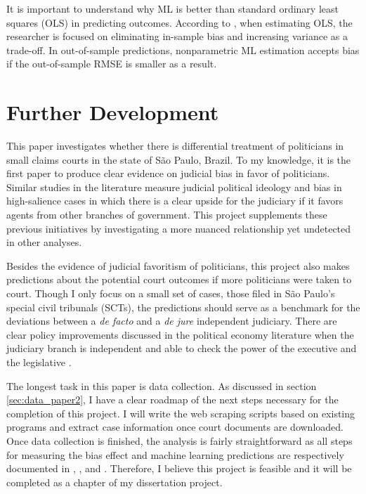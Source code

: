 \documentclass[11pt]{article}
\begin{document}
It is important to understand why ML is better than standard ordinary least squares (OLS) in predicting outcomes. According to \citet{KleinbergPredictionPolicyProblems2015}, when estimating OLS, the researcher is focused on eliminating in-sample bias and increasing variance as a trade-off. In out-of-sample predictions, nonparametric ML estimation accepts bias if the out-of-sample RMSE is smaller as a result.

\section{Further Development} \label{sec:conclusion_paper2}

This paper investigates whether there is differential treatment of politicians in small claims courts in the state of São Paulo, Brazil. To my knowledge, it is the first paper to produce clear evidence on judicial bias in favor of politicians. Similar studies in the literature measure judicial political ideology and bias in high-salience cases in which there is a clear upside for the judiciary if it favors agents from other branches of government. This project supplements these previous initiatives by investigating a more nuanced relationship yet undetected in other analyses.

Besides the evidence of judicial favoritism of politicians, this project also makes predictions about the potential court outcomes if more politicians were taken to court. Though I only focus on a small set of cases, those filed in São Paulo's special civil tribunals (SCTs), the predictions should serve as a benchmark for the deviations between a \emph{de facto} and a \emph{de jure} independent judiciary. There are clear policy improvements discussed in the political economy literature when the judiciary branch is independent and able to check the power of the executive and the legislative \citep{BalandChapter69Governance2010}.

The longest task in this paper is data collection. As discussed in section \ref{sec:data_paper2}, I have a clear roadmap of the next steps necessary for the completion of this project. I will write the web scraping scripts based on existing programs and extract case information once court documents are downloaded. Once data collection is finished, the analysis is fairly straightforward as all steps for measuring the bias effect and machine learning predictions are respectively documented in \citet{AbramsJudgesVaryTheir2012}, \citet{AtheypredictionUsingbig2017,AtheyImpactMachineLearning2019}, and \citet{KleinbergPredictionPolicyProblems2015,KleinbergHumanDecisionsMachine2018}. Therefore, I believe this project is feasible and it will be completed as a chapter of my dissertation project.

\clearpage

\setlength\bibsep{0pt}


\end{document}

